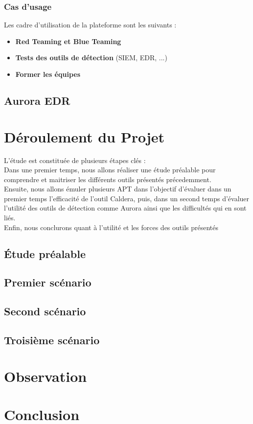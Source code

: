 \documentclass[12pt,letterpaper]{article}
\begin{document}
\subsubsection{Cas d'usage}

Les cadre d'utilisation de la plateforme sont les suivants :
\begin{itemize}
    \item \textbf{Red Teaming et Blue Teaming}
    \item \textbf{Tests des outils de détection} (SIEM, EDR, ...)
    \item \textbf{Former les équipes} 
\end{itemize}

\subsection{Aurora EDR}



\section{Déroulement du Projet}

L'étude est constituée de plusieurs étapes clés : \\
Dans une premier temps, nous allons réaliser une étude préalable pour comprendre et maitriser les différents outils présentés précedemment. \\
Ensuite, nous allons émuler plusieurs APT dans l'objectif d'évaluer dans un premier temps l'efficacité de l'outil Caldera, puis, dans un second temps d'évaluer l'utilité des outils de détection comme Aurora ainsi que les difficultés qui en sont liés. \\
Enfin, nous conclurons quant à l'utilité et les forces des outils présentés 

\subsection{Étude préalable}
\subsection{Premier scénario}
\subsection{Second scénario}
\subsection{Troisième scénario}
\section{Observation}
\section{Conclusion}



\newpage

\end{document}
